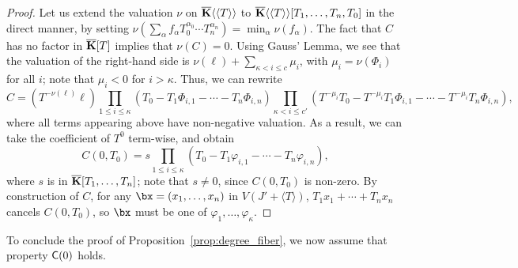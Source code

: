 \documentclass[12pt]{article}
\begin{document}
\begin{proof}
  Let us extend the valuation $\nu$ on $\overline{\mathbf{K}}\langle\langle T\rangle\rangle$
to $\overline{\mathbf{K}}\langle\langle T \rangle\rangle[T_1,\dots,T_n,T_0]$ in the
  direct manner, by setting $\nu(\sum_\alpha f_\alpha T_0^{\alpha_0}
  \cdots T_n^{\alpha_n}) = \min_\alpha \nu(f_\alpha)$. The fact that
  $C$ has no factor in $\overline{\mathbf{K}}[T]$ implies that
  $\nu(C)=0$. Using Gauss' Lemma, we see that the valuation of the
  right-hand side is $\nu(\ell) + \sum_{\kappa < i \le c}\mu_i$, with $\mu_i= \nu(\Phi_i)$ for all $i$;
  note that $\mu_i < 0$ for $i > \kappa$. Thus, we can
  rewrite
  $$C =\left ({T}^{-\nu(\ell)} \ell\right ) 
  \prod_{1 \le i \le \kappa}(T_0-T_1 \Phi_{i,1} - \cdots - T_n  \Phi_{i,n} )
  \prod_{\kappa < i \le c'} ({T}^{-\mu_i}T_0-{T}^{-\mu_i}T_1 \Phi_{i,1} - \cdots - {T}^{-\mu_i}T_n  \Phi_{i,n} ),$$
  where all terms appearing above have non-negative valuation.
  As a result, we can take the coefficient of ${T}^0$ term-wise,
  and obtain
  $$C(0,T_0) = s \prod_{1 \le i \le \kappa}(T_0-T_1 \varphi_{i,1} -
  \cdots - T_n \varphi_{i,n} ),$$ where $s$ is in $\overline{\mathbf{K}}[T_1,\dots,T_n]$;
  note that $s \ne 0$, since $C(0,T_0)$ is non-zero.
 By construction of $C$, for any
  $\bx=(x_1,\dots,x_n)$ in $V(J'+\langle T \rangle)$, $T_1 x_1 + \cdots + T_n x_n$
  cancels $C(0,T_0)$, so $\bx$ must be one of
  $\varphi_1,\dots,\varphi_{\kappa}$.
\end{proof}

To conclude the proof of Proposition~\ref{prop:degree_fiber}, 
we now assume that property $\mathsf{C}(0)$ holds.
\end{document}
